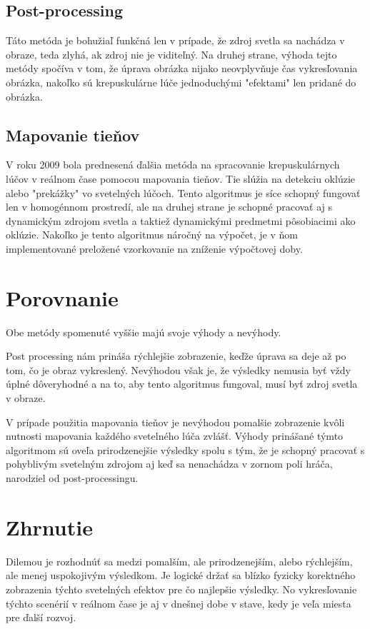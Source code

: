 \documentclass[10pt,twoside,slovak,a4paper]{article}
\begin{document}
\subsection{Post-processing} \label{spracovanie:pp}
Táto metóda je bohužiaľ funkčná len v prípade, že zdroj svetla sa nachádza v obraze, 
teda zlyhá, ak zdroj nie je viditeľný. Na druhej strane, výhoda tejto metódy spočíva v 
tom, že úprava obrázka nijako neovplyvňuje čas vykresľovania obrázka, nakoľko sú 
krepuskulárne lúče jednoduchými "efektami" len pridané do obrázka\cite{Light_shafts}.

\subsection{Mapovanie tieňov} \label{spracovanie:mt}
V roku 2009 bola prednesená ďalšia metóda na spracovanie krepuskulárnych lúčov v reálnom 
čase pomocou mapovania tieňov. Tie slúžia na detekciu oklúzie alebo "prekážky" vo svetelných 
lúčoch. Tento algoritmus je síce schopný fungovať len v homogénnom prostredí, ale na druhej 
strane je schopné pracovať aj s dynamickým zdrojom svetla a taktiež dynamickými predmetmi 
pôsobiacimi ako oklúzie. Nakoľko je tento algoritmus náročný na výpočet, je v ňom 
implementované preložené vzorkovanie na zníženie výpočtovej doby\cite{God_rays}.

\section{Porovnanie} 
\label{por}
Obe metódy spomenuté vyššie majú svoje výhody  a nevýhody.

Post processing nám prináša rýchlejšie zobrazenie, keďže úprava sa deje až po tom, čo 
je obraz vykreslený. Nevýhodou však je, že výsledky nemusia byť vždy úplné dôveryhodné 
a na to, aby tento algoritmus fungoval, musí byť zdroj svetla v obraze. 

V prípade použitia mapovania tieňov je nevýhodou pomalšie zobrazenie kvôli nutnosti 
mapovania každého svetelného lúča zvlášť. Výhody prinášané týmto algoritmom sú oveľa 
prirodzenejšie výsledky spolu s tým, že je schopný pracovať s pohyblivým svetelným 
zdrojom aj keď sa nenachádza v zornom poli hráča, narodziel od post-processingu.

\section{Zhrnutie} 
\label{zhr}
Dilemou je rozhodnúť sa medzi pomalším, ale prirodzenejším, alebo rýchlejším, ale 
menej uspokojivým výsledkom. Je logické držať sa blízko fyzicky korektného zobrazenia 
týchto svetelných efektov pre čo najlepšie výsledky. No vykresľovanie týchto scenérií 
v reálnom čase je aj v dnešnej dobe v stave, kedy je veľa miesta pre ďalší rozvoj.
\end{document}
